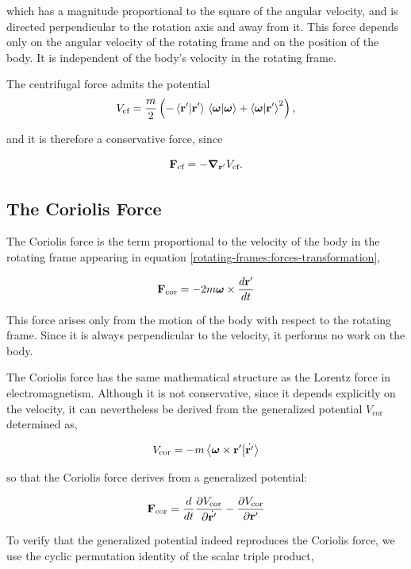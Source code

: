 \documentclass[12pt]{article}
\begin{document}
which has a magnitude proportional to the square of the angular velocity, and is directed perpendicular to
 the rotation axis and away from it. This force depends only on the angular velocity of the rotating frame
  and on the position of the body. It is independent of the body's velocity in the rotating frame. \par

The centrifugal force admits the potential
\[
  V_\text{cf}
  =
  \frac{m}{2}
  \left(
    -\ip{\vb r'}{\vb r'}\,
    \ip{\boldsymbol\omega}{\boldsymbol\omega}
    +
    \ip{\boldsymbol\omega}{\vb r'}^2
  \right),
\]

and it is therefore a conservative force, since

\[
  \vb F_\text{cf}
  =
  -\grad_{\vb r'} V_\text{cf}.
\]

\subsection{The Coriolis Force}

The Coriolis force is the term proportional to the velocity of the body in the
rotating frame appearing in equation \eqref{rotating-frames:forces-transformation},


\begin{equation}
  {\vb F}_\text{cor} = -2m\boldsymbol{\omega}\times\frac{d\vb{r}'}{dt}
  \label{rotating-frames:coriolis-force}
\end{equation}

This force arises only from the motion of the body with respect to the rotating
frame. Since it is always perpendicular to the velocity, it performs no work on
the body. \par


The Coriolis force has the same mathematical structure as the Lorentz force in
electromagnetism. Although it is not conservative, since it depends explicitly on the velocity,
it can nevertheless be derived from the generalized potential $V_\text{cor}$ determined as,

\[
  V_\text{cor} = -m\ip{\boldsymbol{\omega}\times\vb{r}'}{\dot{\vb{r}'}}
\]

so that the Coriolis force derives from a generalized potential:

\[
  \vb{F}_\text{cor} = \frac{d}{dt}\frac{\partial V_\text{cor}}{\partial\dot{\vb{r}'}}
    - \frac{\partial V_\text{cor}}{\partial\vb{r}'}
\]

To verify that the generalized potential indeed reproduces the Coriolis force,
we use the cyclic permutation identity of the scalar triple product,
\end{document}
